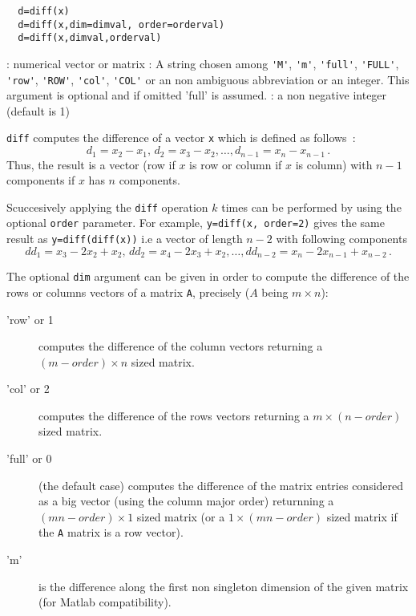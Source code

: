 \begin{mandesc}
\end{mandesc}
\begin{calling_sequence}
\begin{verbatim}
  d=diff(x)  
  d=diff(x,dim=dimval, order=orderval)  
  d=diff(x,dimval,orderval)
\end{verbatim}
\end{calling_sequence}
\begin{parameters}
  \begin{varlist}
    : numerical vector or matrix
    : A string chosen among \verb+'M'+, \verb+'m'+, \verb+'full'+, \verb+'FULL'+, \verb+'row'+,
    \verb+'ROW'+, \verb+'col'+, \verb+'COL'+ or an non ambiguous abbreviation or an integer. 
    This argument is optional and if omitted 'full' is assumed.
    : a non negative integer (default is 1)   
  \end{varlist}
\end{parameters}
\begin{mandescription}
  \verb+diff+ computes the difference of a vector \verb+x+ which is defined as follows~:
$$ d_1 = x_2 - x_1, \, d_2 = x_3 - x_2, \ldots, d_{n-1} = x_{n} - x_{n-1}\,.
$$
 Thus, the result is a vector (row if $x$ is row or column if $x$ is column) with 
 $n-1$ components if $x$ has $n$ components.

 Scuccesively applying the \verb+diff+ operation $k$ times can be performed by 
 using the optional \verb!order! parameter. For example, \verb+y=diff(x, order=2)+ gives 
 the same result as \verb+y=diff(diff(x))+ i.e a vector of length $n-2$ with following 
 components 
$$          
dd_1 = x_3 - 2x_2 + x_2, \, dd_2 = x_4 - 2x_3 + x_2, \ldots, dd_{n-2} = x_n  - 2x_{n-1} + x_{n-2} \,.
$$

The optional \verb!dim! argument can be given in order to compute the difference of the rows or columns vectors
of a matrix \verb+A+, precisely ($A$ being $m \times n$):
  \begin{description}
    \item['row' or 1]  computes the difference of the column vectors returning a $(m-order) \times n$ sized matrix.
    \item['col' or 2]  computes the difference of the rows vectors returning a $m \times (n-order)$ sized matrix.
    \item['full' or 0] (the default case) computes the difference of the matrix entries considered as 
           a big vector (using the column major order) returnning a $(mn - order) \times 1$ sized matrix (or 
           a $1 \times (mn - order)$ sized matrix if the \verb+A+ matrix is a row vector).
    \item['m'] is the difference along the first non singleton dimension of the given matrix
          (for Matlab compatibility). 
  \end{description}
\end{mandescription}

